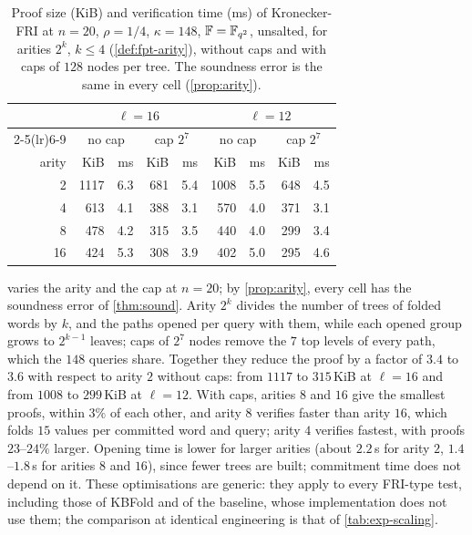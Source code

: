 \begin{table}[t]
\centering
\small
\begin{tabular}{r rr rr rr rr}
\toprule
 & \multicolumn{4}{c}{$\ell = 16$} & \multicolumn{4}{c}{$\ell = 12$} \\
\cmidrule(lr){2-5}\cmidrule(lr){6-9}
 & \multicolumn{2}{c}{no cap} & \multicolumn{2}{c}{cap $2^7$} & \multicolumn{2}{c}{no cap} & \multicolumn{2}{c}{cap $2^7$} \\
arity & KiB & ms & KiB & ms & KiB & ms & KiB & ms \\
\midrule
2 & 1117 & 6.3 & 681 & 5.4 & 1008 & 5.5 & 648 & 4.5 \\
4 & 613 & 4.1 & 388 & 3.1 & 570 & 4.0 & 371 & 3.1 \\
8 & 478 & 4.2 & 315 & 3.5 & 440 & 4.0 & 299 & 3.4 \\
16 & 424 & 5.3 & 308 & 3.9 & 402 & 5.0 & 295 & 4.6 \\
\bottomrule
\end{tabular}
\caption{Proof size (KiB) and verification time (ms) of Kronecker-FRI at $n = 20$, $\rho = 1/4$, $\kappa = 148$, $\mathbb{F} = \mathbb{F}_{q^2}$, unsalted, for arities $2^k$, $k \le 4$ (\cref{def:fpt-arity}), without caps and with caps of $128$ nodes per tree. The soundness error is the same in every cell (\cref{prop:arity}).}
\label{tab:exp-arity}
\end{table}

 varies the arity and the cap at $n = 20$; by \cref{prop:arity}, every cell has the soundness error of \cref{thm:sound}.
Arity $2^k$ divides the number of trees of folded words by $k$, and the paths opened per query with them, while each opened group grows to $2^{k-1}$ leaves; caps of $2^7$ nodes remove the $7$ top levels of every path, which the $148$ queries share.
Together they reduce the proof by a factor of $3.4$ to $3.6$ with respect to arity $2$ without caps: from $1117$ to $315$\,KiB at $\ell = 16$ and from $1008$ to $299$\,KiB at $\ell = 12$.
With caps, arities $8$ and $16$ give the smallest proofs, within $3\%$ of each other, and arity $8$ verifies faster than arity $16$, which folds $15$ values per committed word and query; arity $4$ verifies fastest, with proofs $23$--$24\%$ larger.
Opening time is lower for larger arities (about $2.2$\,s for arity $2$, $1.4$--$1.8$\,s for arities $8$ and $16$), since fewer trees are built; commitment time does not depend on it.
These optimisations are generic: they apply to every FRI-type test, including those of KBFold and of the baseline, whose implementation does not use them; the comparison at identical engineering is that of \cref{tab:exp-scaling}.

